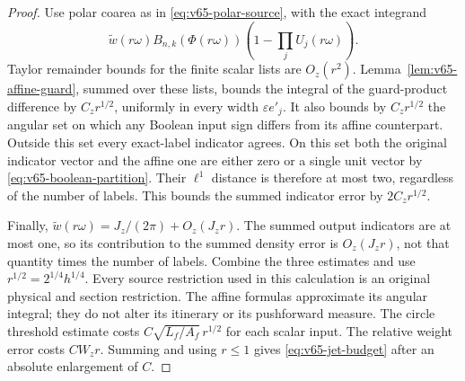 \begin{proof}
Use polar coarea as in \eqref{eq:v65-polar-source}, with the exact
integrand
\[
 \widetilde w(r\omega)B_{n,k}(\Phi(r\omega))
                 \left(1-\prod_jU_j(r\omega)\right).
\]
Taylor remainder bounds for the finite scalar lists are $O_z(r^2)$.
Lemma~\ref{lem:v65-affine-guard}, summed over these lists, bounds
the integral of the guard-product difference by $C_z r^{1/2}$,
uniformly in every width $\varepsilon e'_j$. It also bounds by
$C_zr^{1/2}$ the angular set on which any Boolean input sign differs
from its affine counterpart. Outside this set every exact-label
indicator agrees. On this set both the original indicator vector
and the affine one are either zero or a single unit vector by
\eqref{eq:v65-boolean-partition}. Their $\ell^1$ distance is
therefore at most two, regardless of the number of labels. This
bounds the summed indicator error by $2C_zr^{1/2}$.

Finally, $\widetilde w(r\omega)=J_z/(2\pi)+O_z(J_zr)$.
The summed output indicators are at most one, so its contribution
to the summed density error is $O_z(J_zr)$, not that quantity times
the number of labels. Combine the three estimates and use
$r^{1/2}=2^{1/4}h^{1/4}$. Every source restriction used in this
calculation is an original physical and section restriction. The
affine formulas approximate its angular integral; they do not alter
its itinerary or its pushforward measure. The circle threshold
estimate costs $C\sqrt{L_f/A_f}\,r^{1/2}$ for each scalar input.
The relative weight error costs $CW_zr$. Summing and using $r\le1$
gives \eqref{eq:v65-jet-budget} after an absolute enlargement of $C$.
\end{proof}

